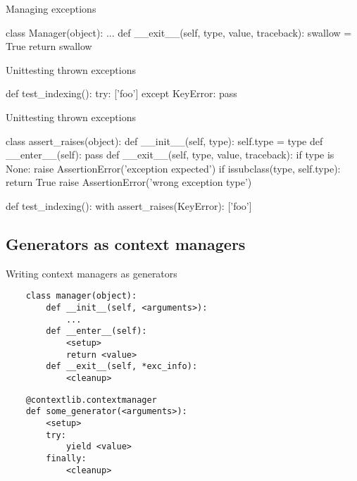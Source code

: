 \documentclass{beamer}
\begin{document}
\begin{frame}[fragile]{Managing exceptions}
  \begin{pycode}
    class Manager(object):
        ...
        def __exit__(self, type, value, traceback):
            swallow = True
            return swallow
  \end{pycode}
\end{frame}

\begin{frame}[fragile]{Unittesting thrown exceptions}
  \begin{pycode}
    def test_indexing():
       try:
          {}['foo']
       except KeyError:
          pass
  \end{pycode}
\end{frame}

\begin{frame}[fragile]{Unittesting thrown exceptions}
  \begin{pycode}
    class assert_raises(object):
        def __init__(self, type):
            self.type = type
        def __enter__(self):
            pass
        def __exit__(self, type, value, traceback):
            if type is None:
                raise AssertionError('exception expected')
            if issubclass(type, self.type):
                return True
            raise AssertionError('wrong exception type')
  \end{pycode}
  \pause
  \begin{pycode}
    def test_indexing():
        with assert_raises(KeyError):
            {}['foo']
  \end{pycode}
\end{frame}

\subsection{Generators as context managers}

\begin{frame}[fragile]{Writing context managers as generators}
  \begin{verbatim}
    class manager(object):
        def __init__(self, <arguments>):
            ...
        def __enter__(self):
            <setup>
            return <value>
        def __exit__(self, *exc_info):
            <cleanup>
  \end{verbatim}
  \pause
  \begin{verbatim}
    @contextlib.contextmanager
    def some_generator(<arguments>):
        <setup>
        try:
            yield <value>
        finally:
            <cleanup>
  \end{verbatim}
\end{frame}
\end{document}
